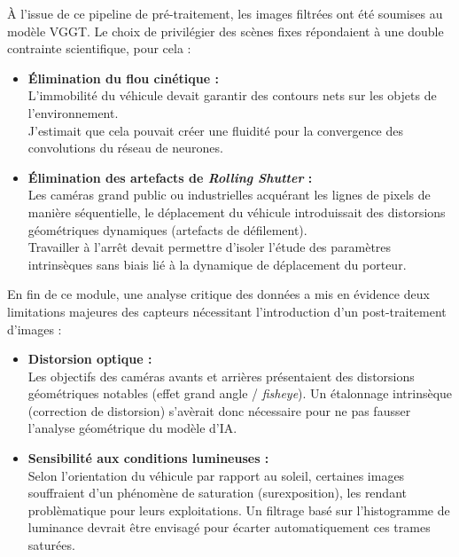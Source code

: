 \documentclass[12pt,a4paper,oneside]{report}
\begin{document}
\hspace*{.3cm}À l'issue de ce pipeline de pré-traitement, les images filtrées ont été soumises au modèle VGGT. Le choix de privilégier des scènes fixes répondaient à une double contrainte scientifique, pour cela :
\begin{itemize}
    \item \textbf{Élimination du flou cinétique :}\\
 L'immobilité du véhicule devait garantir des contours nets sur les objets de l'environnement.\\
 J'estimait que cela pouvait créer une fluidité pour la convergence des convolutions du réseau de neurones.
    \item \textbf{Élimination des artefacts de \textit{Rolling Shutter} :} \\
Les caméras grand public ou industrielles acquérant les lignes de pixels de manière séquentielle, le déplacement du véhicule introduissait des distorsions géométriques dynamiques (artefacts de défilement).\\
 Travailler à l'arrêt devait permettre d'isoler l'étude des paramètres intrinsèques sans biais lié à la dynamique de déplacement du porteur.
\end{itemize}

\bigskip

\hspace*{.3cm} En fin de ce module, une analyse critique des données a mis en évidence deux limitations majeures des capteurs nécessitant l'introduction d'un post-traitement d'images :
\begin{itemize}
    \item \textbf{Distorsion optique :}\\
 Les objectifs des caméras avants et arrières présentaient des distorsions géométriques notables (effet grand angle / \textit{fisheye}). Un étalonnage intrinsèque (correction de distorsion) s'avèrait donc nécessaire pour ne pas fausser l'analyse géométrique du modèle d'IA.
    \item \textbf{Sensibilité aux conditions lumineuses :}\\
 Selon l'orientation du véhicule par rapport au soleil, certaines images souffraient d'un phénomène de saturation (surexposition), les rendant problèmatique pour leurs exploitations. Un filtrage basé sur l'histogramme de luminance devrait être envisagé pour écarter automatiquement ces trames saturées.
\end{itemize}

\newpage
\end{document}

